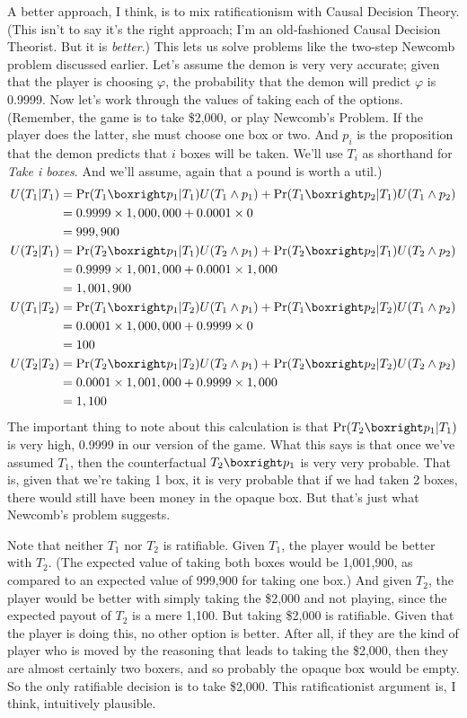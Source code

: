 A better approach, I think, is to mix ratificationism with Causal Decision Theory. (This isn't to say it's the right approach; I'm an old-fashioned Causal Decision Theorist. But it is \textit{better}.) This lets us solve problems like the two-step Newcomb problem discussed earlier. Let's assume the demon is very very accurate; given that the player is choosing $\varphi$, the probability that the demon will predict $\varphi$ is 0.9999. Now let's work through the values of taking each of the options. (Remember, the game is to take \$2,000, or play Newcomb's Problem. If the player does the latter, she must choose one box or two. And $p_i$ is the proposition that the demon predicts that $i$ boxes will be taken. We'll use $T_i$ as shorthand for \textit{Take i boxes}. And we'll assume, again that a pound is worth a util.)
\begin{align*}
U(T_1 | T_1) &= \Pr(T_1 \boxright p_1 | T_1)U(T_1 \wedge p_1) + \Pr(T_1 \boxright p_2 | T_1)U(T_1 \wedge p_2) \\
&= 0.9999 \times 1,000,000 + 0.0001 \times 0 \\
&= 999,900 \\
U(T_2 | T_1) &= \Pr(T_2 \boxright p_1 | T_1)U(T_2 \wedge p_1) + \Pr(T_2 \boxright p_2 | T_1)U(T_2 \wedge p_2) \\
&= 0.9999 \times 1,001,000 + 0.0001 \times 1,000 \\
&= 1,001,900 \\
U(T_1 | T_2) &= \Pr(T_1 \boxright p_1 | T_2)U(T_1 \wedge p_1) + \Pr(T_1 \boxright p_2 | T_2)U(T_1 \wedge p_2) \\
&= 0.0001 \times 1,000,000 + 0.9999 \times 0 \\
&= 100 \\
U(T_2 | T_2) &= \Pr(T_2 \boxright p_1 | T_2)U(T_2 \wedge p_1) + \Pr(T_2 \boxright p_2 | T_2)U(T_2 \wedge p_2) \\
&= 0.0001 \times 1,001,000 + 0.9999 \times 1,000 \\
&= 1,100	
\end{align*} The important thing to note about this calculation is that $\Pr(T_2 \boxright p_1 | T_1)$ is very high, 0.9999 in our version of the game. What this says is that once we've assumed $T_1$, then the counterfactual $T_2 \boxright p_1$ is very very probable. That is, given that we're taking 1 box, it is very probable that if we had taken 2 boxes, there would still have been money in the opaque box. But that's just what Newcomb's problem suggests.

Note that neither $T_1$ nor $T_2$ is ratifiable. Given $T_1$, the player would be better with $T_2$. (The expected value of taking both boxes would be 1,001,900, as compared to an expected value of 999,900 for taking one box.) And given $T_2$, the player would be better with simply taking the \$2,000 and not playing, since the expected payout of $T_2$ is a mere 1,100. But taking \$2,000 is ratifiable. Given that the player is doing this, no other option is better. After all, if they are the kind of player who is moved by the reasoning that leads to taking the \$2,000, then they are almost certainly two boxers, and so probably the opaque box would be empty. So the only ratifiable decision is to take \$2,000. This ratificationist argument is, I think, intuitively plausible.

